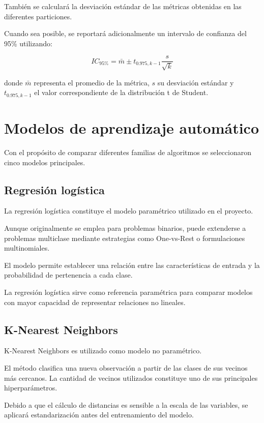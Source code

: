 \documentclass[conference]{IEEEtran}
\begin{document}
También se calculará la desviación estándar de las métricas obtenidas en las diferentes particiones.

Cuando sea posible, se reportará adicionalmente un intervalo de confianza del 95\% utilizando:

\begin{equation}
IC_{95\%}=
\bar{m}\pm
t_{0.975,k-1}
\frac{s}{\sqrt{k}}
\end{equation}

donde $\bar{m}$ representa el promedio de la métrica, $s$ su desviación estándar y $t_{0.975,k-1}$ el valor correspondiente de la distribución t de Student.


\section{Modelos de aprendizaje automático}

Con el propósito de comparar diferentes familias de algoritmos se seleccionaron cinco modelos principales.


\subsection{Regresión logística}

La regresión logística constituye el modelo paramétrico utilizado en el proyecto.

Aunque originalmente se emplea para problemas binarios, puede extenderse a problemas multiclase mediante estrategias como One-vs-Rest o formulaciones multinomiales.

El modelo permite establecer una relación entre las características de entrada y la probabilidad de pertenencia a cada clase.

La regresión logística sirve como referencia paramétrica para comparar modelos con mayor capacidad de representar relaciones no lineales.


\subsection{K-Nearest Neighbors}

K-Nearest Neighbors es utilizado como modelo no paramétrico.

El método clasifica una nueva observación a partir de las clases de sus vecinos más cercanos. La cantidad de vecinos utilizados constituye uno de sus principales hiperparámetros.

Debido a que el cálculo de distancias es sensible a la escala de las variables, se aplicará estandarización antes del entrenamiento del modelo.
\end{document}
